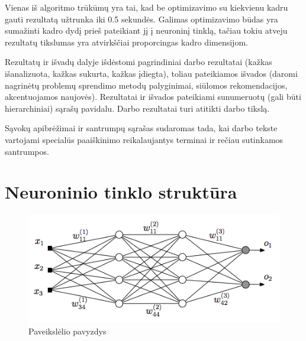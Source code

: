 \documentclass{VUMIFPSbakalaurinis}
\begin{document}
Vienas iš algoritmo trūkūmų yra tai, kad be optimizavimo su kiekvienu kadru gauti rezultatą užtrunka iki 0.5 sekundės. Galimas optimizavimo būdas yra sumažinti kadro dydį prieš pateikiant jį į neuroninį tinklą, tačiau tokiu atveju rezultatų tikslumas yra atvirkščiai proporcingas kadro dimensijom. 

Rezultatų ir išvadų dalyje išdėstomi pagrindiniai darbo rezultatai (kažkas
išanalizuota, kažkas sukurta, kažkas įdiegta), toliau pateikiamos išvados
(daromi nagrinėtų problemų sprendimo metodų palyginimai, siūlomos
rekomendacijos, akcentuojamos naujovės). Rezultatai ir išvados pateikiami
sunumeruotų (gali būti hierarchiniai) sąrašų pavidalu. Darbo rezultatai turi
atitikti darbo tikslą.

\printbibliography[heading=bibintoc]  %

Sąvokų apibrėžimai ir santrumpų sąrašas sudaromas tada, kai darbo tekste
vartojami specialūs paaiškinimo reikalaujantys terminai ir rečiau sutinkamos
santrumpos.

\appendix  %

\section{Neuroninio tinklo struktūra}
\begin{figure}[H]
    \centering
    \includegraphics[scale=0.5]{img/MLP}
    \caption{Paveikslėlio pavyzdys}
    \label{img:mlp}
\end{figure}
\end{document}
